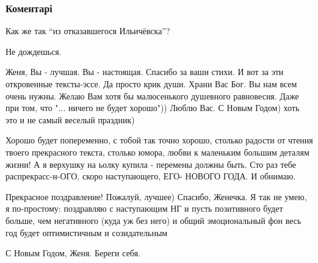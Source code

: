  
 
 
 
 
\subsubsection{Коментарі}

\begin{itemize}

Как же так \enquote{из отказавшегося Ильичёвска}? 🙁

Не дождешься.\Smiley[1.0][yellow]

Женя, Вы - лучшая. Вы - настоящая.
Спасибо за ваши стихи. И вот за эти откровенные тексты-эссе. Да просто крик души. Храни Вас Бог. Вы нам всем очень нужны. Желаю Вам хотя бы малюсенького душевного равновесия. Даже при том, что "... ничего не будет хорошо"))
Люблю Вас. С Новым Годом) хоть это и не самый веселый праздник)

Хорошо будет попеременно, с тобой так точно хорошо, столько радости от чтения
твоего прекрасного текста, столько юмора, любви к маленьким большим деталям
жизни! А я верхушку на ьолку купила - перемены должны быть.  Сто раз тебе
распрекрасс-н-ОГО, скоро наступающего, ЕГО- НОВОГО ГОДА.
И обнимаю.


Прекрасное поздравление! Пожалуй, лучшее) Спасибо, Женечка. Я так не умею, я
по-простому: поздравляю с наступающим НГ и пусть позитивного будет больше, чем
негативного (куда уж без него) и общий эмоциональный фон весь год будет
оптимистичным и созидательным \Smiley[1.0][yellow]


С Новым Годом, Женя. Береги себя.


\end{itemize}
